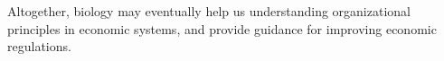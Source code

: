 % 
% 
% 
% 
% 
Altogether, biology may eventually help us understanding organizational principles in economic systems, and provide guidance for improving economic regulations.

%   

% 
% 
% 
% 
% 

% 
% 

% 
% 


